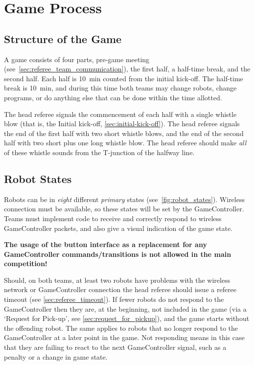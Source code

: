 \section{Game Process}
\label{sec:game_process}

\subsection{Structure of the Game}
\label{sec:game_struct}

A game consists of four parts, pre-game meeting (see~\cref{sec:referee_team_communication}), the first half, a half-time break, and the second half.
Each half is \qty{10}{\minute} counted from the initial kick-off.
The half-time break is \qty{10}{\minute}, and during this time both teams may change robots, change programs, or do anything else that can be done within the time allotted.

The head referee signals the commencement of each half with a single whistle blow (that is, the Initial kick-off, \cf \cref{sec:initial-kick-off}).
The head referee signals the end of the first half with two short whistle blows, and the end of the second half with two short plus one long whistle blow.
The head referee should make \textit{all} of these whistle sounds from the T-junction of the halfway line.

\subsection{Robot States}
\label{sec:robot_states}

Robots can be in \textit{eight} different \emph{primary} states (see~\cref{fig:robot_states}).
Wireless connection must be available, so these states will be set by the GameController.
Teams must implement code to receive and correctly respond to wireless GameController packets, and also give a visual indication of the game state.

\textbf{The usage of the button interface as a replacement for any GameController commands/transitions is not allowed in the main competition!}

Should, on both teams, at least two robots have problems with the wireless network or GameController connection the head referee should issue a referee timeout (see \cref{sec:referee_timeout}).
If fewer robots do not respond to the GameController then they are, at the beginning, not included in the game (via a `Request for Pick-up', see \cref{sec:request_for_pickup}), and the game starts without the offending robot. The same applies to robots that no longer respond to the GameController at a later point in the game. Not responding means in this case that they are failing to react to the next GameController signal, such as a penalty or a change in game state.


